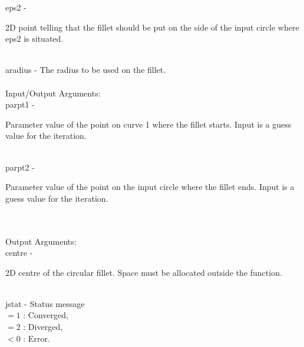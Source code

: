         \>\>    {\fov eps2}   \> - \> \begin{minipg2}
                                        2D point telling that the fillet
                                        should be put on the side of the
                                        input circle where {\fov eps2} is
                                        situated.
                                      \end{minipg2}\\[0.8ex]
        \>\>    {\fov aradius} \> - \> The radius to be used on the fillet.\\
\\
        \>Input/Output Arguments:\\
        \>\>    {\fov parpt1} \> - \> \begin{minipg2}
                                        Parameter value of the point on
                                        curve 1 where the fillet
                                        starts. Input is a guess value
                                        for the iteration.
                                      \end{minipg2}\\[0.8ex]
        \>\>    {\fov parpt2} \> - \> \begin{minipg2}
                                        Parameter value of the point on
                                        the input circle where the
                                        fillet ends. Input is a guess
                                        value for the iteration.
                                      \end{minipg2}\\[0.8ex]
\\
        \>Output Arguments:\\
        \>\>    {\fov centre} \> - \> \begin{minipg2}
                                        2D centre of the circular
                                        fillet.  Space must be allocated
                                        outside the function.
                                      \end{minipg2}\\[0.8ex]
        \>\>    {\fov jstat} \> - \> Status message\\
                \>\>\>\>\> $= 1$      : Converged,\\
                \>\>\>\>\> $= 2$      : Diverged,\\
                \>\>\>\>\> $< 0$      : Error.\\

